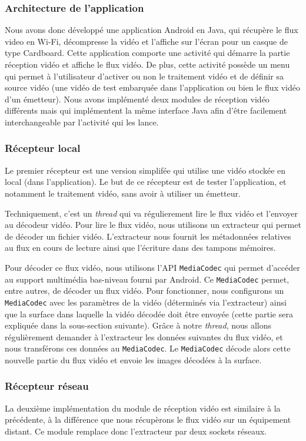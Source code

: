 \documentclass[11pt,a4paper]{article}
\begin{document}
\subsubsection{Architecture de l'application}
Nous avons donc développé une application Android en Java, qui récupère le flux video en Wi-Fi, décompresse la vidéo et l'affiche sur l'écran pour un casque de type Cardboard.
Cette application comporte une activité qui démarre la partie réception vidéo et affiche le flux vidéo. De plus, cette activité possède un menu qui permet à l'utilisateur d'activer ou non le traitement vidéo et de définir sa source vidéo (une vidéo de test embarquée dans l'application ou bien le flux vidéo d'un émetteur).
Nous avons implémenté deux modules de réception vidéo différents mais qui implémentent la même interface Java afin d'être facilement interchangeable par l'activité qui les lance.

\subsubsection{Récepteur local}
Le premier récepteur est une version simplifée qui utilise une vidéo stockée en local (dans l'application).
Le but de ce récepteur est de tester l'application, et notamment le traitement vidéo, sans avoir à utiliser un émetteur.

\bigbreak
Techniquement, c'est un \textit{thread} qui va régulierement lire le flux vidéo et l'envoyer au décodeur vidéo. 
Pour lire le flux vidéo, nous utilisons un extracteur qui permet de décoder un fichier vidéo. 
L'extracteur nous fournit les métadonnées relatives au flux en cours de lecture ainsi que l'écriture dans des tampons mémoires.

\bigbreak
Pour décoder ce flux vidéo, nous utilisons l'API \texttt{MediaCodec} qui permet d'accéder au support multimédia bas-niveau fourni par Android. Ce \texttt{MediaCodec} permet, entre autres, de décoder un flux vidéo.
Pour fonctionner, nous configurons un \texttt{MediaCodec} avec les paramètres de la vidéo (déterminés via l'extracteur) ainsi que la surface dans laquelle la vidéo décodée doit être envoyée (cette partie sera expliquée dans la sous-section suivante).
Grâce à notre \textit{thread}, nous allons régulièrement demander à l'extracteur les données suivantes du flux vidéo, et nous transférons ces données au \texttt{MediaCodec}.
Le \texttt{MediaCodec} décode alors cette nouvelle partie du flux vidéo et envoie les images décodées à la surface.

\subsubsection{Récepteur réseau}
La deuxième implémentation du module de réception vidéo est similaire à la précédente, à la différence que nous récupèrons le flux vidéo sur un équipement distant.
Ce module remplace donc l'extracteur par deux sockets réseaux.
\end{document}
